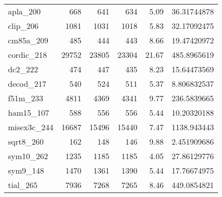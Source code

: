 \begin{table}[tbp]
\begin{tabular}{l|r|r|r|r|r}
      apla\_200                      &668                       &641                        &634                        &5.09                                &36.31744878                            \\
      clip\_206                      &1081                      &1031                       &1018                       &5.83                                &32.17092475                            \\
      cm85a\_209                     &485                       &444                        &443                        &8.66                                &19.47420972                            \\
      cordic\_218                    &29752                     &23805                      &23304                      &21.67                               &485.8965619                            \\
      dc2\_222                       &474                       &447                        &435                        &8.23                                &15.64473569                            \\
      decod\_217                     &540                       &524                        &511                        &5.37                                &8.806832537                            \\
      f51m\_233                      &4811                      &4369                       &4341                       &9.77                                &236.5839665                            \\
      ham15\_107                     &588                       &556                        &556                        &5.44                                &10.20320188                            \\
      misex3c\_244                   &16687                     &15496                      &15440                      &7.47                                &1138.943443                            \\
      sqrt8\_260                     &162                       &148                        &146                        &9.88                                &2.451909686                            \\
      sym10\_262                     &1235                      &1185                       &1185                       &4.05                                &27.86129776                            \\
      sym9\_148                      &1470                      &1361                       &1390                       &5.44                                &17.76674975                            \\
      tial\_265                      &7936                      &7268                       &7265                       &8.46                                &449.0854821                            \\ \hline 
  \end{tabular}
\end{table}